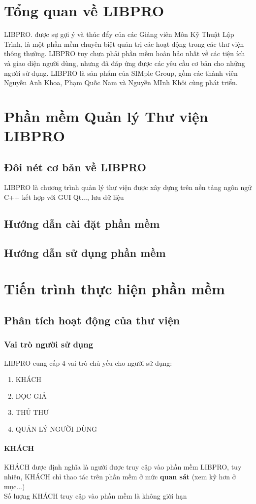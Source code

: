 \documentclass[12pt,a4paper]{report}
\begin{document}
\chapter{Tổng quan về LIBPRO}
LIBPRO. được sự gợi ý và thúc đẩy của các Giảng viên Môn Kỹ Thuật Lập Trình, là một phần mềm chuyên biệt quản trị các hoạt động trong các thư viện thông thường. LIBPRO tuy chưa phải phần mềm hoàn hảo nhất về các tiện ích và giao diện người dùng, nhưng đã đáp ứng được các yêu cầu cơ bản cho những người sử dụng. LIBPRO là sản phẩm của SIMple Group, gồm các thành viên Nguyễn Anh Khoa, Phạm Quốc Nam và Nguyễn MInh Khôi cùng phát triển.
\chapter{Phần mềm Quản lý Thư viện LIBPRO}
	\section{Đôi nét cơ bản về LIBPRO}
	LIBPRO là chương trình quản lý thư viện được xây dựng trên nền tảng ngôn ngữ C++ kết hợp với GUI Qt..., lưu dữ liệu
	\section{Hướng dẫn cài đặt phần mềm}
	\section{Hướng dẫn sử dụng phần mềm}
\chapter{Tiến trình thực hiện phần mềm}
	\section{Phân tích hoạt động của thư viện}
		\subsection{Vai trò người sử dụng}
		LIBPRO cung cấp 4 vai trò chủ yếu cho người sử dụng:
		\begin{enumerate}
			\item KHÁCH
			\item ĐỘC GIẢ
			\item THỦ THƯ
			\item QUẢN LÝ NGƯỜI DÙNG
		\end{enumerate}
			\subsubsection{KHÁCH}
				KHÁCH được định nghĩa là người được truy cập vào phần mềm LIBPRO, tuy nhiên, KHÁCH chỉ thao tác trên phần mềm ở mức \textbf{quan sát} (xem kỹ hơn ở mục...)\\
				Số lượng KHÁCH truy cập vào phần mềm là không giới hạn
\end{document}
